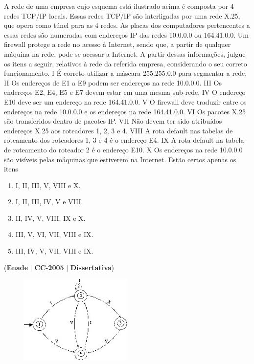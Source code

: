 \documentclass{exam}
\begin{document}
\begin{questions}
A rede de uma empresa cujo esquema está ilustrado
acima é composta por 4 redes TCP/IP locais. Essas redes
TCP/IP são interligadas por uma rede X.25, que opera
como túnel para as 4 redes. As placas dos computadores
pertencentes a essas redes são numeradas com endereços IP
das redes 10.0.0.0 ou 164.41.0.0. Um firewall protege a
rede no acesso à Internet, sendo que, a partir de qualquer
máquina na rede, pode-se acessar a Internet.
A partir dessas informações, julgue os itens a seguir, relativos à
rede da referida empresa, considerando o seu correto
funcionamento.
I É correto utilizar a máscara 255.255.0.0 para segmentar a
rede.
II Os endereços de E1 a E9 podem ser endereços na rede
10.0.0.0.
III Os endereços E2, E4, E5 e E7 devem estar em uma mesma
sub-rede.
IV O endereço E10 deve ser um endereço na rede 164.41.0.0.
V O firewall deve traduzir entre os endereços na rede 10.0.0.0
e os endereços na rede 164.41.0.0.
VI Os pacotes X.25 são transferidos dentro de pacotes IP.
VII Não devem ter sido atribuídos endereços X.25 aos
roteadores 1, 2, 3 e 4.
VIII A rota default nas tabelas de roteamento dos roteadores
1, 3 e 4 é o endereço E4.
IX A rota default na tabela de roteamento do roteador 2 é o
endereço E10.
X Os endereços na rede 10.0.0.0 são visíveis pelas máquinas
que estiverem na Internet.
Estão certos apenas os itens
	\begin{enumerate}[label=\alph*)]
		\item  I, II, III, V, VIII e X.
		\item  I, II, III, IV, V e VIII.
		\item  II, IV, V, VIII, IX e X.
		\item  III, V, VI, VII, VIII e IX.
		\item  III, IV, V, VII, VIII e IX.
	\end{enumerate}

\question (\textbf{Enade} $|$ \textbf{CC}-\textbf{2005} $|$ \textbf{Dissertativa})

\begin{figure}[H]
	\begin{center}
		\includegraphics[width=0.5\textwidth]{CIENCIA_DA_COMPUTACAO_Prova2005-utf8_figuras/fig-0040.jpg}
	\end{center}
\end{figure}


\end{questions}
\end{document}
